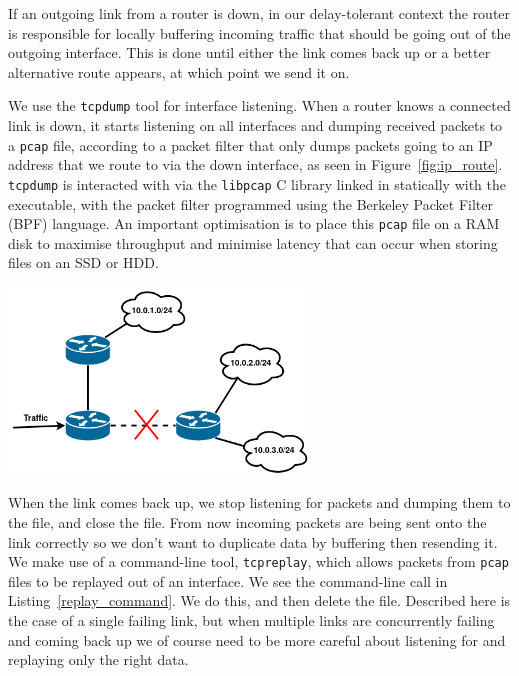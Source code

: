 \documentclass[withindex,glossary,openany]{cam-thesis}
\begin{document}
If an outgoing link from a router is down, in our delay-tolerant context the router is responsible for locally buffering incoming traffic that should be going out of the outgoing interface. This is done until either the link comes back up or a better alternative route appears, at which point we send it on.

We use the \texttt{tcpdump} tool for interface listening. When a router knows a connected link is down, it starts listening on all interfaces and dumping received packets to a \texttt{pcap} file, according to a packet filter that only dumps packets going to an IP address that we route to via the down interface, as seen in Figure~\ref{fig:ip_route}. \texttt{tcpdump} is interacted with via the \texttt{libpcap} C library linked in statically with the executable, with the packet filter programmed using the Berkeley Packet Filter (BPF) language. An important optimisation is to place this \texttt{pcap} file on a RAM disk to maximise throughput and minimise latency that can occur when storing files on an SSD or HDD.

\begin{center}
\begin{minipage}{0.9\textwidth} \centering
	\includegraphics[width=0.6\textwidth]{ip_route}
	\label{fig:ip_route}
\end{minipage}
\end{center}

When the link comes back up, we stop listening for packets and dumping them to the file, and close the file. From now incoming packets are being sent onto the link correctly so we don't want to duplicate data by buffering then resending it. We make use of a command-line tool, \texttt{tcpreplay}, which allows packets from \texttt{pcap} files to be replayed out of  an interface. We see the command-line call in Listing~\ref{replay_command}. We do this, and then delete the file. Described here is the case of a single failing link, but when multiple links are concurrently failing and coming back up we of course need to be more careful about listening for and replaying only the right data.
\end{document}
